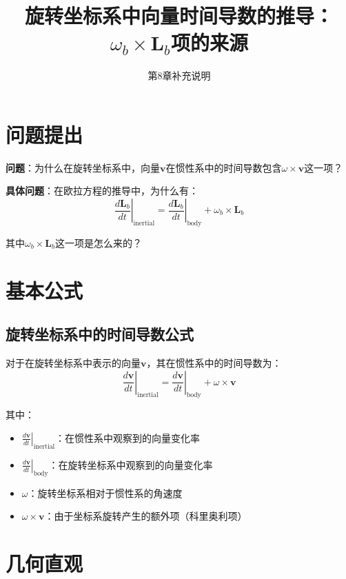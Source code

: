 \documentclass[12pt,a4paper]{article}
\title{旋转坐标系中向量时间导数的推导：$\omega_b \times \bm{L}_b$项的来源}
\author{第8章补充说明}
\date{}
\begin{document}
\maketitle

\section{问题提出}

\textbf{问题}：为什么在旋转坐标系中，向量$\bm{v}$在惯性系中的时间导数包含$\omega \times \bm{v}$这一项？

\textbf{具体问题}：在欧拉方程的推导中，为什么有：
\begin{equation}
\left.\frac{d\bm{L}_b}{dt}\right|_{\text{inertial}} = \left.\frac{d\bm{L}_b}{dt}\right|_{\text{body}} + \omega_b \times \bm{L}_b
\end{equation}

其中$\omega_b \times \bm{L}_b$这一项是怎么来的？

\section{基本公式}

\subsection{旋转坐标系中的时间导数公式}

对于在旋转坐标系中表示的向量$\bm{v}$，其在惯性系中的时间导数为：
\begin{equation}
\left.\frac{d\bm{v}}{dt}\right|_{\text{inertial}} = \left.\frac{d\bm{v}}{dt}\right|_{\text{body}} + \omega \times \bm{v}
\label{eq:rotating_derivative}
\end{equation}

其中：
\begin{itemize}
\item $\left.\frac{d\bm{v}}{dt}\right|_{\text{inertial}}$：在惯性系中观察到的向量变化率
\item $\left.\frac{d\bm{v}}{dt}\right|_{\text{body}}$：在旋转坐标系中观察到的向量变化率
\item $\omega$：旋转坐标系相对于惯性系的角速度
\item $\omega \times \bm{v}$：由于坐标系旋转产生的额外项（科里奥利项）
\end{itemize}

\section{几何直观}
\end{document}
